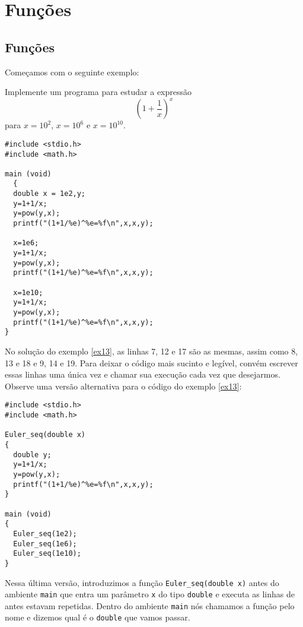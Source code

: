 \chapter{Funções}
\section{Funções}
Começamos com o seguinte exemplo:
\begin{ex}\label{ex13}Implemente um programa para estudar a expressão 
$$
\left(1+\frac{1}{x}\right)^x
$$
para $x=10^{2}$, $x=10^{6}$ e $x=10^{10}$.
\end{ex}
\begin{verbatim}
#include <stdio.h>
#include <math.h>
 
main (void)
  {
  double x = 1e2,y;
  y=1+1/x;
  y=pow(y,x);
  printf("(1+1/%e)^%e=%f\n",x,x,y);

  x=1e6;
  y=1+1/x;
  y=pow(y,x);
  printf("(1+1/%e)^%e=%f\n",x,x,y);

  x=1e10;
  y=1+1/x;
  y=pow(y,x);
  printf("(1+1/%e)^%e=%f\n",x,x,y);
}
\end{verbatim}
No solução do exemplo \ref{ex13}, as linhas 7, 12 e 17 são as mesmas, assim como 8, 13 e 18 e 9, 14 e 19. Para deixar o código mais sucinto e legível, convém escrever essas linhas uma única vez e chamar sua execução cada vez que desejarmos. Observe uma versão alternativa para o código do exemplo \ref{ex13}:
\begin{verbatim}
#include <stdio.h>
#include <math.h>

Euler_seq(double x)
{
  double y;
  y=1+1/x;
  y=pow(y,x);
  printf("(1+1/%e)^%e=%f\n",x,x,y);
}

main (void)
{
  Euler_seq(1e2);
  Euler_seq(1e6);
  Euler_seq(1e10);
}
\end{verbatim}
Nessa última versão, introduzimos a função \verb|Euler_seq(double x)| antes do ambiente \verb|main| que entra um parâmetro \verb|x| do tipo \verb|double| e executa as linhas de antes estavam repetidas. Dentro do ambiente \verb|main| nós chamamos a função pelo nome e dizemos qual é o \verb|double| que vamos passar.

